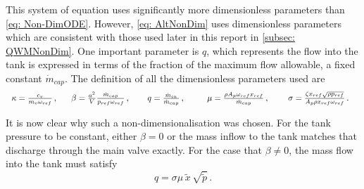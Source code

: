 This system of equation uses significantly more dimensionless parameters than \cref{eq: Non-DimODE}. However, \cref{eq: AltNonDim} uses dimensionless parameters which are consistent with those used later in this report in \cref{subsec: QWMNonDim}. One important parameter is $q$, which represents the flow into the tank is expressed in terms of the fraction of the maximum flow allowable, a fixed constant $\dot{m}_{cap}$. The definition of all the dimensionless parameters used are
~
\begin{equation*}
    \begin{tabular}{p{2.1cm} p{2.8cm} p{2.1cm} p{3cm} p{2.8cm}}
        $ \kappa = \frac{c_v}{m_v \omega_{ref}} \, , $
        &
        $ \beta = \frac{a^2}{V} \frac{\dot{m}_{cap}}{p_{ref} \omega_{ref}} \, , $
        &
        $ q = \frac{\dot{m}_{in}}{\dot{m}_{cap}} \, , $
        &
        $ \mu = \frac{\rho A_p \omega_{ref} x_{ref}}{\dot{m}_{cap}} \, , $
        &
        $ \sigma = \frac{\zeta x_{ref} \sqrt{\rho p_{ref}}}{A_p \rho x_{ref} \omega_{ref}} \, . $
    \end{tabular}
\end{equation*}

It is now clear why such a non-dimensionalisation was chosen. For the tank pressure to be constant, either $\beta = 0$ or the mass inflow to the tank matches that discharge through the main valve exactly. For the case that $\beta \neq 0$, the mass flow into the tank must satisfy
~
\begin{equation*}
    q = \sigma \mu \, \tilde{x} \, \sqrt{\tilde{p}} \, .
\end{equation*}

